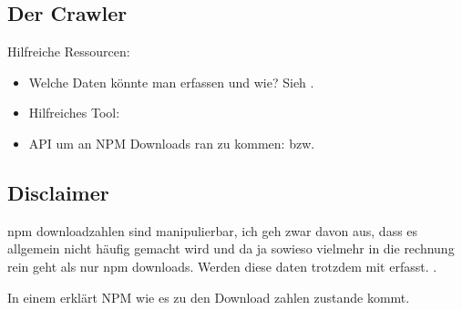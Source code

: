


\subsection{Der Crawler}

Hilfreiche Ressourcen:

\begin{itemize}
    \item Welche Daten könnte man erfassen und wie? Sieh .
    \item Hilfreiches Tool: 
    \item API um an NPM Downloads ran zu kommen:
          bzw.
\end{itemize}



\subsection{Disclaimer}

npm downloadzahlen sind manipulierbar, ich geh zwar davon aus, dass es allgemein nicht häufig gemacht wird
und da ja sowieso vielmehr in die rechnung rein geht als nur npm downloads. Werden diese daten trotzdem mit erfasst.
.

In einem 
erklärt NPM wie es zu den Download zahlen zustande kommt.



